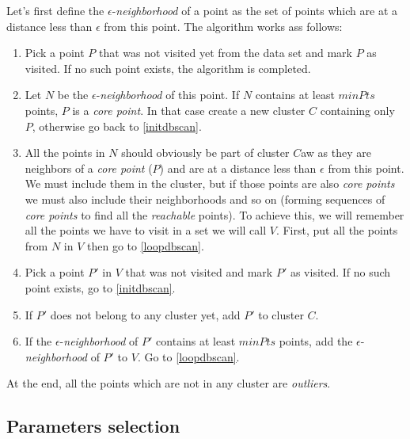 Let's first define the $\epsilon$-\emph{neighborhood} of a point as the set of points which are at a distance less than $\epsilon$ from this point. The algorithm works ass follows\cite{dbscan}:
\begin{enumerate}
	\item \label{initdbscan} Pick a point $P$ that was not visited yet from the data set and mark $P$ as visited. If no such point exists, the algorithm is completed.
	\item Let $N$ be the $\epsilon$-\emph{neighborhood} of this point. If $N$ contains at least $minPts$ points, $P$ is a \emph{core point}. In that case create a new cluster $C$ containing only $P$, otherwise go back to \ref{initdbscan}.
	\item All the points in $N$ should obviously be part of cluster $C$aw as they are neighbors of a \emph{core point} ($P$) and are at a distance less than $\epsilon$ from this point. We must include them in the cluster, but if those points are also \emph{core points} we must also include their neighborhoods and so on (forming sequences of \emph{core points} to find all the \emph{reachable} points). To achieve this, we will remember all the points we have to visit in a set we will call $V$. First, put all the points from $N$ in $V$ then go to \ref{loopdbscan}.
	\item \label{loopdbscan} Pick a point $P'$ in $V$ that was not visited and mark $P'$ as visited. If no such point exists, go to \ref{initdbscan}.
	\item If $P'$ does not belong to any cluster yet, add $P'$ to cluster $C$.
	\item If the $\epsilon$-\emph{neighborhood} of $P'$ contains at least $minPts$ points, add the $\epsilon$-\emph{neighborhood} of $P'$ to $V$. Go to \ref{loopdbscan}.
\end{enumerate}

At the end, all the points which are not in any cluster are \emph{outliers}.

\subsection{Parameters selection}\label{subsec:paramselect}

